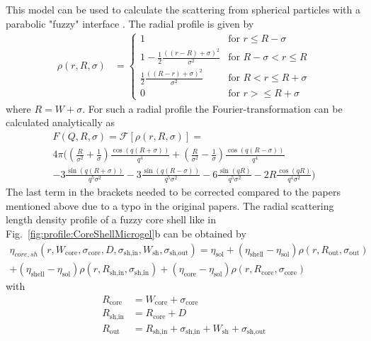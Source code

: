 This model can be used to calculate the scattering from spherical
particles with a parabolic "fuzzy" interface \cite{Berndt2005,Berndt2006,Berndt2006a}.
The radial profile is given by
\begin{align}
\rho(r,R,\sigma) &=
\begin{cases}
1 & \mbox{for } r\leq R-\sigma \\
1-\frac{1}{2}\frac{\left((r-R)+\sigma\right)^2}{\sigma^2} & \mbox{for } R-\sigma < r \leq R \\
\frac{1}{2}\frac{\left((R-r)+\sigma\right)^2}{\sigma^2} & \mbox{for } R< r\leq R+\sigma \\
0 & \mbox{for } r > \leq R+\sigma
\end{cases}
\label{eq:CoreShellMicrogelProfile}
\end{align}
where $R=W+\sigma$. For such a radial profile the Fourier-transformation can be calculated analytically as
\begin{multline}
F(Q,R,\sigma) = \mathcal{F}[\rho(r,R,\sigma)] = \\
4 \pi \Bigg(
        \left(\frac{R}{\sigma^2}+\frac{1}{\sigma}\right) \frac{\cos (q(R+\sigma))}{q^4}
    +   \left(\frac{R}{\sigma^2}-\frac{1}{\sigma}\right) \frac{\cos (q(R-\sigma))}{q^4} \\
    -   3 \frac{\sin(q(R+\sigma))}{q^5 \sigma^2}
    -   3 \frac{\sin(q(R-\sigma))}{q^5 \sigma^2}
    -   6  \frac{\sin(qR)}{q^5 \sigma^2}
    -   2 R \frac{\cos(qR)}{q^4 \sigma^2}
\Bigg)
\end{multline}
The last term in the brackets needed to be corrected compared to the papers mentioned above
due to a typo in the original papers.
The radial scattering length density profile of a fuzzy core
shell like in Fig.\ \ref{fig:profile:CoreShellMicrogel}b can be obtained by
\begin{multline}
\eta_{core,sh}(r,W_\textrm{core},\sigma_\textrm{core},D,\sigma_\textrm{sh,in},W_\textrm{sh},\sigma_\textrm{sh,out}) =
    \eta_\textrm{sol}
+ (\eta_\textrm{shell}-\eta_\textrm{sol}) \rho(r,R_\textrm{out},\sigma_\textrm{out}) \\
+ (\eta_\textrm{shell}-\eta_\textrm{sol}) \rho(r,R_\textrm{sh,in},\sigma_\textrm{sh,in})
+ (\eta_\textrm{core} -\eta_\textrm{sol}) \rho(r,R_\textrm{core},\sigma_\textrm{core})
\end{multline}
with
\begin{subequations}
\begin{align}
    R_\textrm{core} &= W_\textrm{core}+\sigma_\textrm{core} \\
    R_\textrm{sh,in}&= R_\textrm{core}+D \\
    R_\textrm{out}  &= R_\textrm{sh,in}+\sigma_\textrm{sh,in}+W_\textrm{sh}+\sigma_\textrm{sh,out}
\end{align}
\label{eq:radiiCoreShellMicrogel}
\end{subequations}
